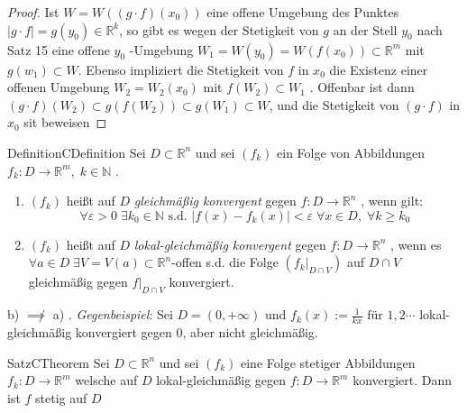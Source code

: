 \documentclass[11.5 pt, a4paper]{memoir}
\begin{document}
\begin{proof}
	Ist $ W = W \left( \left( g \cdot f \right) \left( x_0 \right)  \right)  $ eine offene Umgebung des Punktes $ \left| g \cdot f\right| 
	= g(y_0) \in \mathbb{R}^k $, so gibt es wegen der Stetigkeit von $ g $ an der Stell $ y_0 $ nach Satz 15 eine offene $ y_0 $ -Umgebung
	$ W_1 = W(y_0) = W \left( f \left( x_0 \right)  \right) \subset  \mathbb{R}^m $ mit $ g \left( w_1 \right) \subset W $. Ebenso 
	impliziert die Stetigkeit von $ f $ in $ x_0 $ die Existenz einer offenen Umgebung $ W_2 = W_2 \left( x_0 \right) $ mit
	$ f \left( W_2 \right) \subset W_1 $ . Offenbar ist dann $ \left( g \cdot f \right) \left( W_2 \right) \subset g \left( f 
	\left( W_2 \right) \right) \subset g \left( W_1 \right) \subset W $, und die Stetigkeit von $ \left( g \cdot f \right)  $ in
	$ x_0 $ sit beweisen
\end{proof}
\begin{ibox}[]{Definition}{CDefinition}
    Sei $ D \subset \mathbb{R}^n  $ und sei $ \left( f_{k} \right)  $ ein Folge von Abbildungen $ f_{k}: D \to \mathbb{R}^m, \; k \in 
	\mathbb{N} $ .
	\begin{enumerate}[label=\alph*)]
		\item $ \left( f_{k} \right)  $ heißt auf $ D $  \textit{gleichmäßig konvergent} gegen $ f: D \to \mathbb{R}^n $ , wenn gilt:
			$$ \forall \varepsilon > 0 \; \exists k_0 \in \mathbb{N} \text{ s.d. } \left| f(x) - f_{k}(x) \right| < \varepsilon \; 
			\forall x \in  D, \; \forall k \geq k_0$$
		\item $ \left( f_{k} \right)  $ heißt auf $ D $  \textit{lokal-gleichmäßig konvergent} gegen $ f: D \to \mathbb{R}^n $ , wenn es
			$ \forall a \in D \; \exists V = V(a) \subset  \mathbb{R}^n $-offen s.d. die Folge 
			$ \left( \left. f_{k} \right|_{D \cap V} \right)  $ auf $ D \cap V $ gleichmäßig gegen 
			$ \left. f \right|_{D \cap V}  $ konvergiert.
	\end{enumerate}
\end{ibox}

b) $\not \implies$ a) . \textit{Gegenbeispiel}: Sei $ D = (0, + \infty) $ und $ f_{k}(x) := \frac{1}{kx} \text{ für } 1,2 \cdots  $ 
lokal-gleichmäßig konvergiert gegen $ 0 $, aber nicht gleichmäßig.

\begin{ibox}[20]{Satz}{CTheorem}
    Sei $ D \subset  \mathbb{R}^n  $ und sei $ \left( f_k \right)  $ eine Folge stetiger Abbildungen $ f_k : D \to \mathbb{R}^m $ 
	welsche auf $ D $ lokal-gleichmäßig gegen $ f: D \to \mathbb{R}^m $ konvergiert. Dann ist $ f $ stetig auf $ D $ 
\end{ibox}
\end{document}
